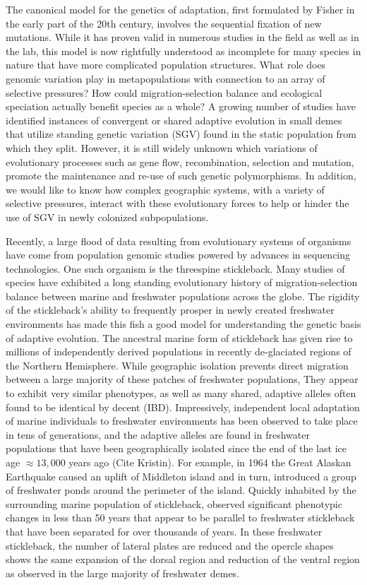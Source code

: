 \documentclass{article}
\newcommand{\plr}[1]{\todo[linecolor=blue,backgroundcolor=blue!25,bordercolor=blue]{#1}}
\begin{document}
The canonical model for the genetics of adaptation, first formulated by Fisher in the early part of the 20th century, involves the sequential fixation of new mutations. 
While it has proven valid in numerous studies in the field as well as in the lab, this model is now rightfully understood as incomplete for many species in nature that have more complicated population structures. 
What role does genomic variation play in metapopulations with connection to an array of selective pressures?
How could migration-selection balance and ecological speciation actually benefit species as a whole?
A growing number of studies have identified instances of convergent or shared adaptive evolution in small demes that utilize standing genetic variation (SGV) found in the static population from which they split.
However, it is still widely unknown which variations of evolutionary processes such as gene flow, recombination, selection and mutation, promote the maintenance and re-use of such genetic polymorphisms.
In addition, we would like to know how complex geographic systems, with a variety of selective pressures, interact with these evolutionary forces to help or hinder the use of SGV in newly colonized subpopulations.
\plr{I like the spirit of the first paragraph, but want to totally rewrite it}

Recently, a large flood of data resulting from evolutionary systems of organisms have come from population genomic studies powered by advances in sequencing technologies. 
One such organism is the threespine stickleback. 
Many studies of species have exhibited a long standing evolutionary history of migration-selection balance between marine and freshwater populations across the globe.
The rigidity of the stickleback's ability to frequently prosper in newly created freshwater environments has made this fish a good model for understanding the genetic basis of adaptive evolution. 
The ancestral marine form of stickleback has given rise to millions of independently derived populations in recently de-glaciated regions of the Northern Hemisphere.
While geographic isolation prevents direct migration between a large majority of these patches of freshwater populations,
They appear to exhibit very similar phenotypes, as well as many shared, adaptive alleles often found to be identical by decent (IBD). 
Impressively, independent local adaptation of marine individuals to freshwater environments has been observed to take place in tens of generations, 
and the adaptive alleles are found in freshwater populations that have been geographically isolated since the end of the last ice age $\approx 13,000$ years ago (Cite Kristin).
For example, in 1964 the Great Alaskan Earthquake caused an uplift of Middleton island and in turn, introduced a group of freshwater ponds around the perimeter of the island. 
Quickly inhabited by the surrounding marine population of stickleback, 
\citet{lescak2015evolution} observed significant phenotypic changes in less than 50 years that appear to be parallel to freshwater stickleback that have been separated for over thousands of years. 
In these freshwater stickleback, the number of lateral plates are reduced and the opercle shapes shows
the same expansion of the dorsal region and reduction of the ventral region as observed in the large majority of freshwater demes.
\end{document}
